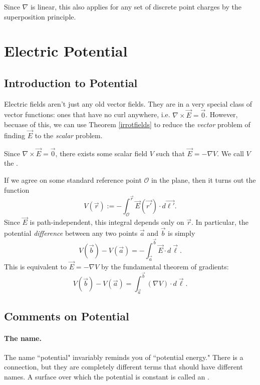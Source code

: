 Since $\nabla$ is linear, this also applies for any set of discrete point charges by the superposition principle.

\section{Electric Potential}

\subsection{Introduction to Potential}

Electric fields aren't just any old vector fields. They are in a very special class of vector functions: ones that have no curl anywhere, i.e. $\nabla\times\vec{E}=\vec{0}$. However, becuase of this, we can use Theorem \ref{irrotfields} to reduce the \textit{vector} problem of finding $\vec{E}$ to the \textit{scalar} problem.

\begin{definition}
Since $\nabla\times\vec{E}=\vec{0}$, there exists some scalar field $V$ such that $\vec{E}=-\nabla V$. We call $V$ the . 
\end{definition}

If we agree on some standard reference point $\mathcal{O}$ in the plane, then it turns out the function
\[V(\vec{r}):=-\int_{\mathcal{O}}^{\vec{r}} \vec{E}(\vec{r'})\cdot d\vec{\ell'}.\]
Since $\vec{E}$ is path-independent, this integral depends only on $\vec{r}$. In particular, the potential \textit{difference} between any two points $\vec{a}$ and $\vec{b}$ is simply
\[V(\vec{b})-V(\vec{a})=-\int_{\vec{a}}^{\vec{b}}\vec{E}\cdot d\vec{\ell}.\]
This is equivalent to $\vec{E}=-\nabla V$ by the fundamental theorem of gradients:
\[V(\vec{b})-V(\vec{a})=\int_{\vec{a}}^{\vec{b}}(\nabla V)\cdot d\vec{\ell}.\]

\subsection{Comments on Potential}

\paragraph{The name.} The name ``potential" invariably reminds you of ``potential energy." There is a connection, but they are completely different terms that should have different names. A surface over which the potential is constant is called an .

